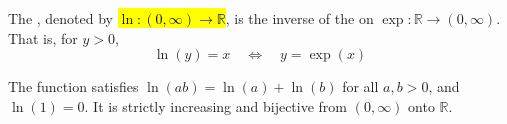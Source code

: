\begin{definition} \label{definition:real_natural_logarithm_function_as_inverse_of_real_exponential_function}
The , denoted by \hl{$\ln : (0, \infty) \to \mathbb{R}$}, is the inverse of the  on $\exp: \mathbb{R} \to (0,\infty)$. That is, for $y > 0$,
$$\ln(y) = x \quad \iff \quad y = \exp(x)$$


\TODO{}
The function satisfies $\ln(ab) = \ln(a) + \ln(b)$ for all $a, b > 0$, and $\ln(1) = 0$. It is strictly increasing and bijective from $(0, \infty)$ onto $\mathbb{R}$.
\end{definition}
